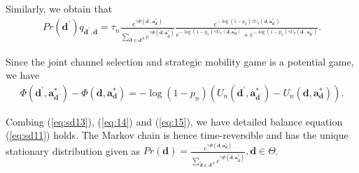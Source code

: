 Similarly, we obtain that\begin{align}
  Pr(\boldsymbol{d}^{'})q_{\boldsymbol{d}^{'},\boldsymbol{d}} = \tau_{n}\frac{e^{\gamma\Phi(\boldsymbol{d}^{'},\boldsymbol{a}_{\boldsymbol{d}^{'}}^{*})}}{\sum_{\tilde{\boldsymbol{d}}\in\mathcal{\boldsymbol{d}}^{N}}e^{\gamma\Phi(\tilde{\boldsymbol{d}},\boldsymbol{a}_{\tilde{\boldsymbol{d}}}^{*})}}\frac{e^{-\log(1-p_{n})\gamma U_{n}(\boldsymbol{d},\boldsymbol{a}_{\boldsymbol{d}^{'}}^{*})}}{e^{-\log(1-p_{n})\gamma U_{n}(\boldsymbol{d},\boldsymbol{a}_{\boldsymbol{d}}^{*})}+e^{-\log(1-p_{n})\gamma U_{n}(\boldsymbol{d}^{'},\boldsymbol{a}_{\boldsymbol{d}^{'}}^{*})}}.\label{eq:14} \end{align}

Since the joint channel selection and strategic mobility game is a potential game, we have\begin{align}
 \Phi(\boldsymbol{d}^{'},\boldsymbol{a}_{\boldsymbol{d}^{'}}^{*})-\Phi(\boldsymbol{d},\boldsymbol{a}_{\boldsymbol{d}}^{*})=-\log(1-p_{n})\left(U_{n}(\boldsymbol{d}^{'},\boldsymbol{a}_{\boldsymbol{d}^{'}}^{*})-U_{n}(\boldsymbol{d},\boldsymbol{a}_{\boldsymbol{d}}^{*})\right).\label{eq:15}\end{align}

Combing (\ref{eq:sd13}), (\ref{eq:14}) and (\ref{eq:15}), we have
detailed balance equation (\ref{eq:sd11}) holds. The Markov chain
is hence time-reversible and has the unique stationary distribution given as $
Pr(\boldsymbol{d})=\frac{e^{\gamma\Phi(\boldsymbol{d},\boldsymbol{a}_{\boldsymbol{d}}^{*})}}{\sum_{\tilde{\boldsymbol{d}}\in\mathcal{\boldsymbol{d}}^{N}}e^{\gamma\Phi(\tilde{\boldsymbol{d}},\boldsymbol{a}_{\tilde{\boldsymbol{d}}}^{*})}},\boldsymbol{d}\in\Theta$.


